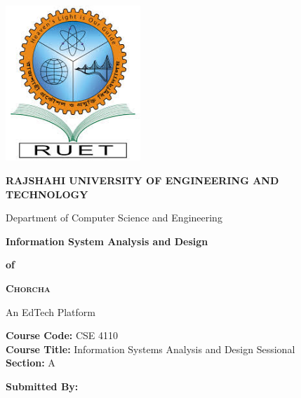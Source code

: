 \documentclass[12pt,a4paper,oneside]{book}
\begin{document}
\begin{titlepage}
    \centering
    
    \vspace*{-1cm}
    \includegraphics[width=2in]{RUET_logo.jpeg}
    
    \vspace{0.3cm}
    {\Large\textbf{\color{chapterblue}RAJSHAHI UNIVERSITY OF ENGINEERING AND TECHNOLOGY}}
    
    \vspace{0.15cm}
    {\large\color{sectionblue}Department of Computer Science and Engineering}
    
    \vspace{1.2cm}
    {\LARGE\textbf{\color{chapterblue}Information System Analysis and Design}}
    
    \vspace{0.2cm}
    {\Large\textbf{\color{sectionblue}of}}
    
    \vspace{0.2cm}
    {\LARGE\textbf{\color{chapterblue}\textsc{Chorcha}}}
    
    \vspace{0.15cm}
    {\large\color{subsectionteal}An EdTech Platform}
    
    \vspace{0.8cm}
    \begin{minipage}{0.8\textwidth}
        \centering
        \color{accentgray}
        \textbf{Course Code:} CSE 4110 \\[0.05cm]
        \textbf{Course Title:} Information Systems Analysis and Design Sessional \\[0.05cm]
        \textbf{Section:} A
    \end{minipage}
    
    \vspace{0.6cm}
    \begin{minipage}{0.9\textwidth}
        \centering
        {\large\textbf{\color{chapterblue}Submitted By:}}
        \vspace{0.2cm}
        

\end{minipage}
\end{titlepage}
\end{document}
